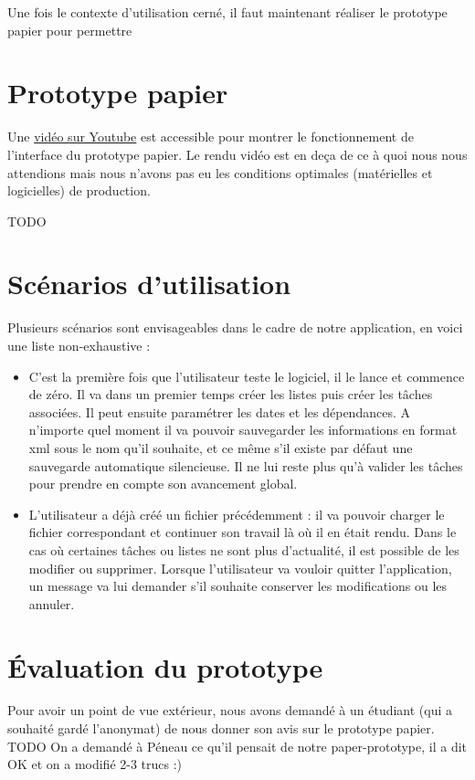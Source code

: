 		Une fois le contexte d'utilisation cerné, il faut maintenant réaliser le prototype papier pour permettre
	
	\section{Prototype papier}
	Une \href{https://www.youtube.com/watch?v=xbLaZvgkzjQ}{vidéo sur Youtube} est accessible pour montrer le fonctionnement de l'interface du prototype papier. Le rendu vidéo est en deça de ce à quoi nous nous attendions mais nous n'avons pas eu les conditions optimales (matérielles et logicielles) de production.
	
	TODO
	

	\section{Scénarios d'utilisation}
		Plusieurs scénarios sont envisageables dans le cadre de notre application, en voici une liste non-exhaustive :
	
		\begin{itemize}
			\item C'est la première fois que l'utilisateur teste le logiciel, il le lance et commence de zéro. Il va dans un premier temps créer les listes puis créer les tâches associées. Il peut ensuite paramétrer les dates et les dépendances. A n'importe quel moment il va pouvoir sauvegarder les informations en format xml sous le nom qu'il souhaite, et ce même s'il existe par défaut une sauvegarde automatique silencieuse. Il ne lui reste plus qu'à valider les tâches pour prendre en compte son avancement global.
			\item L'utilisateur a déjà créé un fichier précédemment : il va pouvoir charger le fichier correspondant et continuer son travail là où il en était rendu. Dans le cas où certaines tâches ou listes ne sont plus d'actualité, il est possible de les modifier ou supprimer. Lorsque l'utilisateur va vouloir quitter l'application, un message va lui demander s'il souhaite conserver les modifications ou les annuler. 
		\end{itemize}
	
	
	\section{Évaluation du prototype}
		Pour avoir un point de vue extérieur, nous avons demandé à un étudiant (qui a souhaité gardé l'anonymat) de nous donner son avis sur le prototype papier. TODO 
		On a demandé à Péneau ce qu'il pensait de notre paper-prototype, il a dit OK et on a modifié 2-3 trucs :)
		


